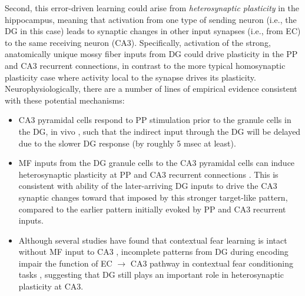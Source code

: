 \documentclass[11pt,twoside]{article}
\newif\myifpdf
\begin{document}
Second, this error-driven learning could arise from \emph{heterosynaptic plasticity} in the hippocampus, meaning that activation from one type of sending neuron (i.e., the DG in this case) leads to synaptic changes in other input synapses (i.e., from EC) to the same receiving neuron (CA3).  Specifically, activation of the strong, anatomically unique mossy fiber inputs from DG could drive plasticity in the PP and CA3 recurrent connections, in contrast to the more typical homosynaptic plasticity case where activity local to the synapse drives its plasticity.  Neurophysiologically, there are a number of lines of empirical evidence consistent with these potential mechanisms:
\begin{itemize}

	\item CA3 pyramidal cells respond to PP stimulation prior to the granule cells in the DG, in vivo \citep{YeckelBerger90,DoMartinezMartinezEtAl02}, such that the indirect input through the DG will be delayed due to the slower DG response (by roughly 5 msec at least).

    \item MF inputs from the DG granule cells to the CA3 pyramidal cells can induce heterosynaptic plasticity at PP and CA3 recurrent connections \citep{McMahonBarrionuevo02,TsukamotoYasuiYamadaEtAl03,KobayashiPoo04,RebolaCartaMulle17}. This is consistent with ability of the later-arriving DG inputs to drive the CA3 synaptic changes toward that imposed by this stronger target-like pattern, compared to the earlier pattern initially evoked by PP and CA3 recurrent inputs.

    \item Although several studies have found that contextual fear learning is intact without MF input to CA3 \citep{McHughJonesQuinnEtAl07,NakashibaCushmanPelkeyEtAl12,KitamuraSunMartinEtAl15}, incomplete patterns from DG during encoding impair the function of EC $\rightarrow$ CA3 pathway in contextual fear conditioning tasks \citep{BernierLacagninaAyoubEtAl17}, suggesting that DG still plays an important role in heterosynaptic plasticity at CA3.
\end{itemize}
\end{document}
